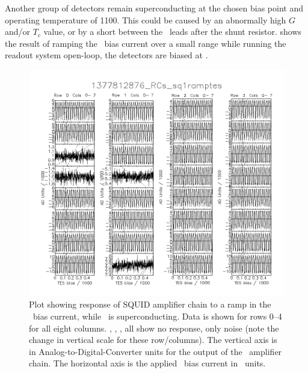 Another group of detectors remain superconducting at the chosen bias point and operating temperature of \SI{1100}{\mK}.
This could be caused by an abnormally high $G$ and/or $T_c$ value, or by a short between the \TES\ leads after the shunt resistor.
 shows the result of ramping the \TES\ bias current over a small range while running the readout system open-loop, the detectors are biased at \SOC.

\begin{figure}
\centering
\includegraphics[width=\textwidth]{./images/1377812876_RCs_sq1ramptes_00.png}
\caption[\SQUID\ response to \TES\ bias ramp (superconducting)]{
  Plot showing response of SQUID amplifier chain to a ramp in the \TES\ bias current, while \TES\ is superconducting.
  Data is shown for rows 0--4 for all eight columns.
  , , ,  all show no response, only noise (note the change in vertical scale for these row/columns).
  The vertical axis is in Analog-to-Digital-Converter units for the output of the \SQUID\ amplifier chain.
  The horizontal axis is the applied \TES\ bias current in \DAC\ units.
}
\label{fig:tes-bias-ramp-sc}
\end{figure}

